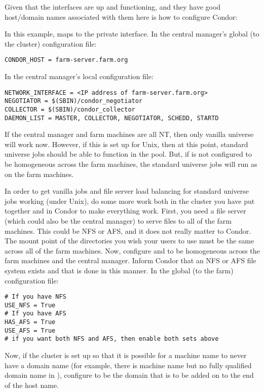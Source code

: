 Given that the interfaces are up and functioning, and they have good
host/domain names associated with them here is how to configure Condor:

In this example,  maps to the private interface.
In the central manager's global (to the cluster) configuration file:
\begin{verbatim}
CONDOR_HOST = farm-server.farm.org
\end{verbatim}

In the central manager's local configuration file:
\begin{verbatim}
NETWORK_INTERFACE = <IP address of farm-server.farm.org>
NEGOTIATOR = $(SBIN)/condor_negotiator
COLLECTOR = $(SBIN)/condor_collector
DAEMON_LIST = MASTER, COLLECTOR, NEGOTIATOR, SCHEDD, STARTD
\end{verbatim}

If the central manager and farm machines are all NT, then only
vanilla universe will work now.  However, if this is set up
for Unix, then at this point, standard universe jobs should be able to
function in the pool.
But, if  is not configured
to be homogeneous across the farm machines, the standard universe
jobs will run as  on the farm machines.

In order to get vanilla jobs and file server load balancing for standard
universe jobs working (under Unix), do some more work both in
the cluster you have put together and in Condor to make everything work.
First, you need a file server (which could also be the central manager) to
serve files to all of the farm machines. This could be NFS or AFS, 
and it does not really matter to Condor. 
The mount point of the directories you wish
your users to use must be the same across all of the farm machines. Now,
configure  and  to be
homogeneous across the farm machines and the central manager. 
Inform Condor that an NFS or AFS file system exists and that
is done in this manner. In the global (to the farm) configuration file:

\begin{verbatim}
# If you have NFS
USE_NFS = True
# If you have AFS
HAS_AFS = True
USE_AFS = True
# if you want both NFS and AFS, then enable both sets above
\end{verbatim}

Now, if the cluster is set up so that it is possible for a machine
name to never have a domain name
(for example, there is machine
name but no fully qualified domain name in ),
configure  to be the domain that is
to be added on to the end of the host name.


